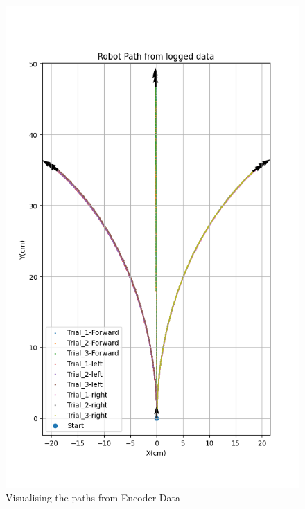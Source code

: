 {        \begin{figure}[!ht] 
            \centering \includegraphics[scale=.60]{"images/experiment_2/2.path.png"}
            \caption{Visualising the paths from Encoder Data}
            \label{fig:path}
        \end{figure}
        
}
